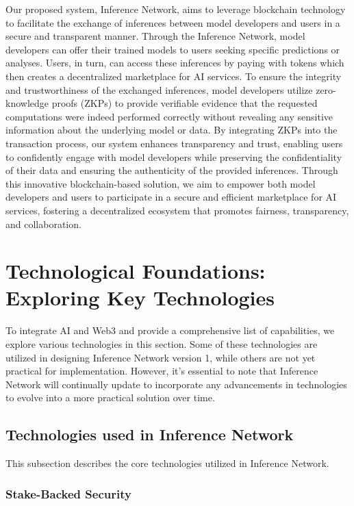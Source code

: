 \documentclass[conference]{IEEEtran}
\begin{document}
Our proposed system, Inference Network, aims to leverage blockchain technology to facilitate the exchange of inferences between model developers and users in a secure and transparent manner. Through the Inference Network, model developers can offer their trained models to users seeking specific predictions or analyses. Users, in turn, can access these inferences by paying with tokens which then creates a decentralized marketplace for AI services. To ensure the integrity and trustworthiness of the exchanged inferences, model developers utilize zero-knowledge proofs (ZKPs) to provide verifiable evidence that the requested computations were indeed performed correctly without revealing any sensitive information about the underlying model or data. By integrating ZKPs into the transaction process, our system enhances transparency and trust, enabling users to confidently engage with model developers while preserving the confidentiality of their data and ensuring the authenticity of the provided inferences. Through this innovative blockchain-based solution, we aim to empower both model developers and users to participate in a secure and efficient marketplace for AI services, fostering a decentralized ecosystem that promotes fairness, transparency, and collaboration.

\section{Technological Foundations: Exploring Key Technologies}
To integrate AI and Web3 and provide a comprehensive list of capabilities, we explore various technologies in this section. Some of these technologies are utilized in designing Inference Network version 1, while others are not yet practical for implementation. However, it's essential to note that Inference Network will continually update to incorporate any advancements in technologies to evolve into a more practical solution over time.

\subsection{Technologies used in Inference Network}

This subsection describes the core technologies utilized in Inference Network.

\subsubsection{Stake-Backed Security}
\end{document}
